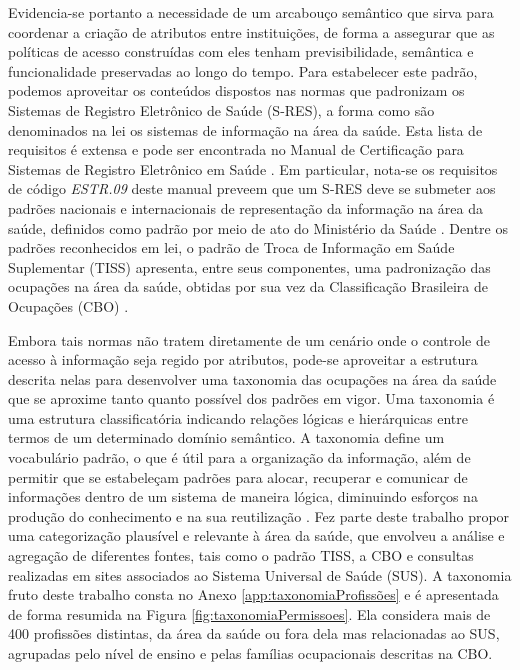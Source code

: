 \documentclass[a4paper,11pt]{article}
\begin{document}
Evidencia-se portanto a necessidade de um arcabouço semântico que sirva para coordenar a criação de atributos entre instituições, de forma a assegurar que as políticas de acesso construídas com eles tenham previsibilidade, semântica e funcionalidade preservadas ao longo do tempo.
Para estabelecer este padrão, podemos aproveitar os conteúdos dispostos nas normas que padronizam os Sistemas de Registro Eletrônico de Saúde (S-RES), a forma como são denominados na lei os sistemas de informação na área da saúde.
Esta lista de requisitos é extensa e pode ser encontrada no Manual de Certificação para Sistemas de Registro Eletrônico em Saúde \cite{SBIS2016}.
Em particular, nota-se os requisitos de código \emph{ESTR.09} deste manual preveem que um S-RES deve se submeter aos padrões nacionais e internacionais de representação da informação na área da saúde, definidos como padrão por meio de ato do Ministério da Saúde \cite{MinisteriodaSaude2011}.
Dentre os padrões reconhecidos em lei, o padrão de Troca de Informação em Saúde Suplementar (TISS) \cite{ANS2020} apresenta, entre seus componentes, uma padronização das ocupações na área da saúde, obtidas por sua vez da Classificação Brasileira de Ocupações (CBO) \cite{MTE2010}.


Embora tais normas não tratem diretamente de um cenário onde o controle de acesso à informação seja regido por atributos, pode-se aproveitar a estrutura descrita nelas para desenvolver uma taxonomia das ocupações na área da saúde que se aproxime tanto quanto possível dos padrões em vigor.
Uma taxonomia é uma estrutura classificatória indicando relações lógicas e hierárquicas entre termos de um determinado domínio semântico.
A taxonomia define um vocabulário padrão, o que é útil para a organização da informação, além de permitir que se estabeleçam padrões para alocar, recuperar e comunicar de informações dentro de um sistema de maneira lógica, diminuindo esforços na produção do conhecimento e na sua reutilização \cite{Campos2007}. %
Fez parte deste trabalho propor uma categorização plausível e relevante à área da saúde, que envolveu a análise e agregação de diferentes fontes, tais como o padrão TISS, a CBO e consultas realizadas em sites associados ao Sistema Universal de Saúde (SUS).
A taxonomia fruto deste trabalho consta no Anexo \ref{app:taxonomiaProfissões} e é apresentada de forma resumida na Figura \ref{fig:taxonomiaPermissoes}. %
Ela considera mais de 400 profissões distintas, da área da saúde ou fora dela mas relacionadas ao SUS, agrupadas pelo nível de ensino e pelas famílias ocupacionais descritas na CBO.
\end{document}
